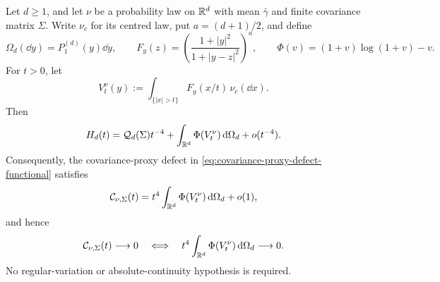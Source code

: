 \begin{theorem}
\label{thm:raw-tail-poisson-energy-decomposition}
Let \(d\ge1\), and let \(\nu\) be a probability law on \(\mathbb{R}^d\) with
mean \(\bar\gamma\) and finite covariance matrix \(\Sigma\).  Write
\(\nu_c\) for its centred law, put \(a=(d+1)/2\), and define
\[
 \Omega_d(\dd y)=P_1^{(d)}(y)\dd y,
 \qquad
 F_y(z)=\left(\frac{1+|y|^2}{1+|y-z|^2}\right)^a,
 \qquad
 \Phi(v)=(1+v)\log(1+v)-v.
\]
For \(t>0\), let
\begin{equation}\label{eq:raw-tail-poisson-potential}
 V_t^\nu(y):=\int_{\{|x|>t\}}F_y(x/t)\,\nu_c(\dd x).
\end{equation}
Then
\begin{equation}\label{eq:raw-tail-entropy-decomposition}
 H_d(t)=\mathcal Q_d(\Sigma)t^{-4}
 +\int_{\mathbb{R}^d}\Phi(V_t^\nu)\,\mathrm{d}\Omega_d+o(t^{-4}).
\end{equation}
Consequently, the covariance-proxy defect in
\eqref{eq:covariance-proxy-defect-functional} satisfies
\begin{equation}\label{eq:raw-tail-proxy-decomposition}
 \mathcal C_{\nu,\Sigma}(t)
 =t^4\int_{\mathbb{R}^d}\Phi(V_t^\nu)\,\mathrm{d}\Omega_d+o(1),
\end{equation}
and hence
\begin{equation}\label{eq:raw-tail-proxy-equivalence}
 \mathcal C_{\nu,\Sigma}(t)\longrightarrow0
 \quad\Longleftrightarrow\quad
 t^4\int_{\mathbb{R}^d}\Phi(V_t^\nu)\,\mathrm{d}\Omega_d\longrightarrow0.
\end{equation}
No regular-variation or absolute-continuity hypothesis is required.
\end{theorem}

